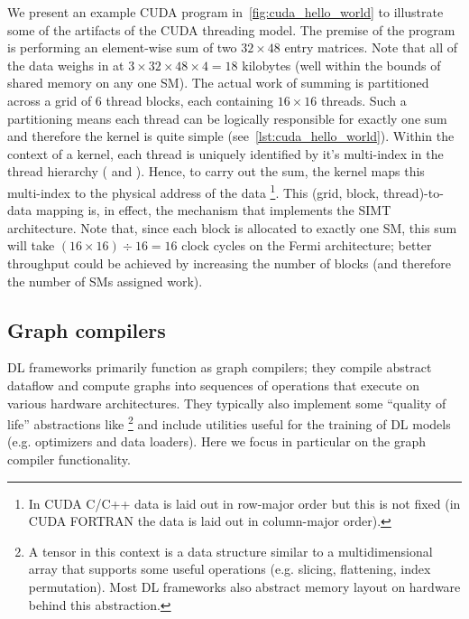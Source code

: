 We present an example CUDA program in~\cref{fig:cuda_hello_world} to illustrate some of the artifacts of the CUDA threading model.
The premise of the program is performing an element-wise sum of two $32 \times 48$ entry matrices.
Note that all of the data weighs in at  $3 \times 32 \times 48 \times 4 = 18$ kilobytes (well within the bounds of shared memory on any one SM).
The actual work of summing is partitioned across a grid of 6 thread blocks, each containing $16 \times 16$ threads.
Such a partitioning means each thread can be logically responsible for exactly one sum and therefore the kernel is quite simple (see~\cref{lst:cuda_hello_world}).
Within the context of a kernel, each thread is uniquely identified by it's multi-index in the thread hierarchy ( and ).
Hence, to carry out the sum, the kernel maps this multi-index to the physical address of the data%
\footnote{In CUDA C/C++ data is laid out in row-major order but this is not fixed (in CUDA FORTRAN the data is laid out in column-major order).}.
This (grid, block, thread)-to-data mapping is, in effect, the mechanism that implements the SIMT architecture.
Note that, since each block is allocated to exactly one SM, this sum will take $\left( 16 \times 16 \right) \div 16 = 16$ clock cycles on the Fermi architecture;
better throughput could be achieved by increasing the number of blocks (and therefore the number of SMs assigned work).



\subsection{Graph compilers}\label{subsec:graph-compilers}

DL frameworks primarily function as graph compilers;
they compile abstract dataflow and compute graphs into sequences of operations that execute on various hardware architectures.
They typically also implement some ``quality of life'' abstractions like %
\footnote{A tensor in this context is a data structure similar to a multidimensional array that supports some useful operations (e.g. slicing, flattening, index permutation). Most DL frameworks also abstract memory layout on hardware behind this abstraction.} and include utilities useful for the training of DL models (e.g. optimizers and data loaders).
Here we focus in particular on the graph compiler functionality.

